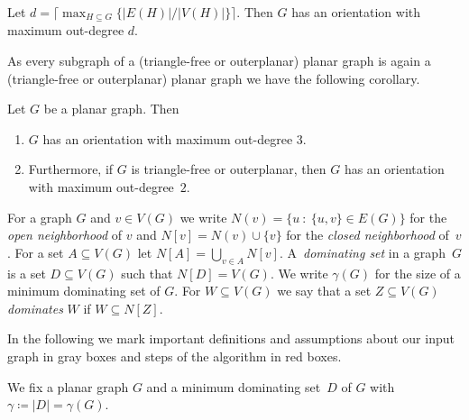 \begin{lemma}\label{lem:orientations}
Let $d=\lceil\max_{H\subseteq G}\{|E(H)|/|V(H)|\}\rceil$. Then $G$ has an 
orientation with maximum out-degree $d$. 
\end{lemma}

As every subgraph of a (triangle-free or outerplanar) planar graph 
is again a (triangle-free or outerplanar) planar graph we
have the following corollary. 

\begin{cor}\label{cor:planar-orientations}
Let $G$ be a planar graph. Then 

  \vspace{-2mm}
\begin{enumerate}
\item $G$ has an orientation with maximum out-degree $3$. \smallskip
\item Furthermore, if $G$ is triangle-free or outerplanar, then 
$G$ has an orientation with maximum out-degree~$2$. 
\end{enumerate}
\end{cor}

For a graph $G$ and $v\in V(G)$ we write
$N(v)=\{u~:~\{u,v\}\in E(G)\}$ for the \emph{open neighborhood} of $v$
and $N[v]=N(v)\cup\{v\}$ for the \emph{closed neighborhood}
of~$v$. For a set $A\subseteq V(G)$ let $N[A]=\bigcup_{v\in A}N[v]$.
A~\emph{dominating set} in a graph~$G$ is a set $D\subseteq V(G)$ such
that $N[D]=V(G)$. We write $\gamma(G)$ for the size of a minimum
dominating set of $G$. For $W\subseteq V(G)$ we say that a set
$Z\subseteq V(G)$ \emph{dominates} $W$ if $W\subseteq N[Z]$.

\smallskip
In the following we mark important definitions and assumptions about
our input graph in gray boxes and steps of the algorithm in red boxes.

\begin{tcolorbox}
  We fix a planar graph $G$ and a minimum dominating set~$D$ of $G$
  with $\gamma \coloneqq |D|=\gamma(G)$.
\end{tcolorbox}
